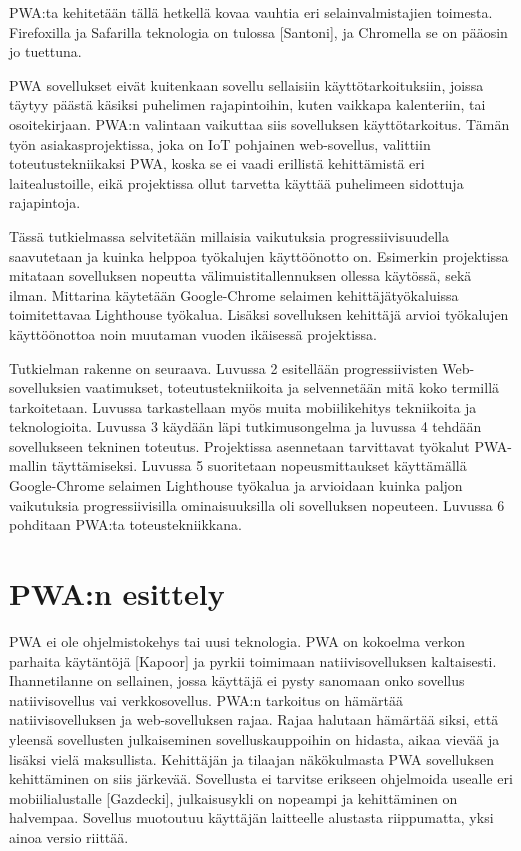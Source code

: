 \documentclass{tktltiki}
\begin{document}
PWA:ta kehitetään tällä hetkellä kovaa vauhtia eri selainvalmistajien toimesta. Firefoxilla ja Safarilla teknologia on tulossa [Santoni], ja Chromella se on pääosin jo tuettuna. 

PWA sovellukset eivät kuitenkaan sovellu sellaisiin käyttötarkoituksiin, joissa täytyy päästä käsiksi puhelimen rajapintoihin, kuten vaikkapa kalenteriin, tai osoitekirjaan. PWA:n valintaan vaikuttaa siis sovelluksen käyttötarkoitus. Tämän työn asiakasprojektissa, joka on IoT pohjainen web-sovellus, valittiin toteutustekniikaksi PWA, koska se ei vaadi erillistä kehittämistä eri laitealustoille, eikä projektissa ollut tarvetta käyttää puhelimeen sidottuja rajapintoja.

Tässä tutkielmassa selvitetään millaisia vaikutuksia progressiivisuudella saavutetaan ja kuinka helppoa työkalujen käyttöönotto on. Esimerkin projektissa mitataan sovelluksen nopeutta välimuistitallennuksen ollessa käytössä, sekä ilman. Mittarina käytetään Google-Chrome selaimen kehittäjätyökaluissa toimitettavaa Lighthouse työkalua. Lisäksi sovelluksen kehittäjä arvioi työkalujen käyttöönottoa noin muutaman vuoden ikäisessä projektissa. 

Tutkielman rakenne on seuraava. Luvussa 2 esitellään progressiivisten Web-sovelluksien vaatimukset, toteutustekniikoita ja selvennetään mitä koko termillä tarkoitetaan. Luvussa tarkastellaan myös muita mobiilikehitys tekniikoita ja teknologioita. Luvussa 3 käydään läpi tutkimusongelma ja luvussa 4 tehdään sovellukseen tekninen toteutus. Projektissa asennetaan tarvittavat työkalut PWA-mallin täyttämiseksi. Luvussa 5 suoritetaan nopeusmittaukset käyttämällä Google-Chrome selaimen Lighthouse työkalua ja arvioidaan kuinka paljon vaikutuksia progressiivisilla ominaisuuksilla oli sovelluksen nopeuteen. Luvussa 6 pohditaan PWA:ta toteustekniikkana.

\newpage
\section{PWA:n esittely}

PWA ei ole ohjelmistokehys tai uusi teknologia. PWA on kokoelma verkon parhaita käytäntöjä [Kapoor] ja pyrkii toimimaan natiivisovelluksen kaltaisesti. Ihannetilanne on sellainen, jossa käyttäjä ei pysty sanomaan onko sovellus natiivisovellus vai verkkosovellus. PWA:n tarkoitus on hämärtää natiivisovelluksen ja web-sovelluksen rajaa. Rajaa halutaan hämärtää siksi, että yleensä sovellusten julkaiseminen sovelluskauppoihin on hidasta, aikaa vievää ja lisäksi vielä maksullista. Kehittäjän ja tilaajan näkökulmasta PWA sovelluksen kehittäminen on siis järkevää. Sovellusta ei tarvitse erikseen ohjelmoida usealle eri mobiilialustalle [Gazdecki], julkaisusykli on nopeampi ja kehittäminen on halvempaa. Sovellus muotoutuu käyttäjän laitteelle alustasta riippumatta, yksi ainoa versio riittää.
\end{document}
